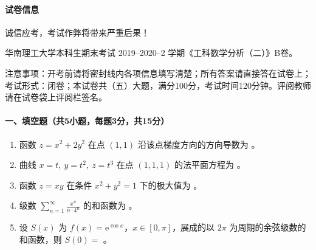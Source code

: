 \paragraph*{试卷信息}
诚信应考，考试作弊将带来严重后果！

华南理工大学本科生期末考试 2019--2020--2 学期《工科数学分析（二）》B卷。

注意事项：开考前请将密封线内各项信息填写清楚；所有答案请直接答在试卷上；考试形式：闭卷；本试卷共（五）大题，满分100分，考试时间120分钟。评阅教师请在试卷袋上评阅栏签名。

\paragraph*{一、填空题（共5小题，每题3分，共15分）}
\begin{enumerate}
  \item 函数 \(z=x^2+2y^2\) 在点 \((1,1)\) 沿该点梯度方向的方向导数为 \underline{\hspace{5cm}}。
  \item 曲线 \(x=t,\ y=t^2,\ z=t^3\) 在点 \((1,1,1)\) 的法平面方程为 \underline{\hspace{5cm}}。
  \item 函数 \(z=xy\) 在条件 \(x^2+y^2=1\) 下的极大值为 \underline{\hspace{5cm}}。
  \item 级数 \(\displaystyle \sum_{n=1}^{\infty}\frac{x^n}{n\cdot4^n}\) 的和函数为 \underline{\hspace{5cm}}。
  \item 设 \(S(x)\) 为 \(f(x)=\mathrm{e}^{\cos x}\)，\(x\in[0,\pi]\)，展成的以 \(2\pi\) 为周期的余弦级数的和函数，则 \(S(0)=\) \underline{\hspace{5cm}}。
\end{enumerate}


